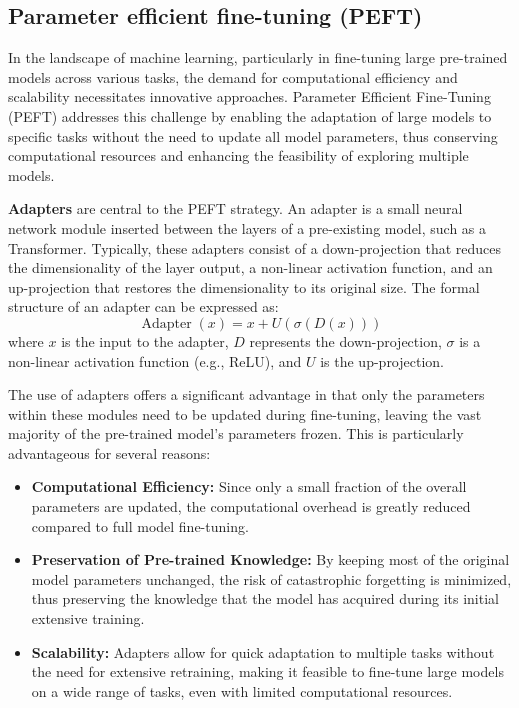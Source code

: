 \documentclass[conference]{IEEEtran}
\begin{document}
\subsection{Parameter efficient fine-tuning (PEFT)}%
In the landscape of machine learning, particularly in fine-tuning large pre-trained models across various tasks, the demand for computational efficiency and scalability necessitates innovative approaches. Parameter Efficient Fine-Tuning (PEFT) addresses this challenge by enabling the adaptation of large models to specific tasks without the need to update all model parameters, thus conserving computational resources and enhancing the feasibility of exploring multiple models.

\textbf{Adapters} are central to the PEFT strategy. An adapter is a small neural network module inserted between the layers of a pre-existing model, such as a Transformer. Typically, these adapters consist of a down-projection that reduces the dimensionality of the layer output, a non-linear activation function, and an up-projection that restores the dimensionality to its original size. The formal structure of an adapter can be expressed as:
\[
\operatorname{Adapter}(x) = x + U(\sigma(D(x)))
\]
where $x$ is the input to the adapter, $D$ represents the down-projection, $\sigma$ is a non-linear activation function (e.g., ReLU), and $U$ is the up-projection.

The use of adapters offers a significant advantage in that only the parameters within these modules need to be updated during fine-tuning, leaving the vast majority of the pre-trained model's parameters frozen. This is particularly advantageous for several reasons:
\begin{itemize}
    \item \textbf{Computational Efficiency:} Since only a small fraction of the overall parameters are updated, the computational overhead is greatly reduced compared to full model fine-tuning.
    \item \textbf{Preservation of Pre-trained Knowledge:} By keeping most of the original model parameters unchanged, the risk of catastrophic forgetting is minimized, thus preserving the knowledge that the model has acquired during its initial extensive training.
    \item \textbf{Scalability:} Adapters allow for quick adaptation to multiple tasks without the need for extensive retraining, making it feasible to fine-tune large models on a wide range of tasks, even with limited computational resources.
\end{itemize}
\end{document}
